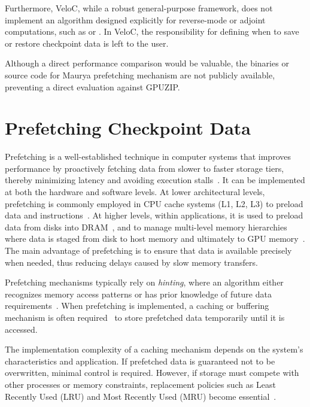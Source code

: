 \documentclass[Ingles]{ic-tese-v3}
\begin{document}
Furthermore, VeloC, while a robust general-purpose \checkpointing framework, does not implement an algorithm designed explicitly for reverse-mode or adjoint computations, such as \revolve or \zcut. In VeloC, the responsibility for defining when to save or restore checkpoint data is left to the user.

Although a direct performance comparison would be valuable, the binaries or source code for Maurya \etal prefetching mechanism are not publicly available, preventing a direct evaluation against GPUZIP.


\chapter{Prefetching Checkpoint Data}
\label{ch:prefetch}

Prefetching is a well-established technique in computer systems that improves performance by proactively fetching data from slower to faster storage tiers, thereby minimizing latency and avoiding execution stalls~\cite{mittal2017,vanderwiel2000}. It can be implemented at both the hardware and software levels. At lower architectural levels, prefetching is commonly employed in CPU cache systems (L1, L2, L3) to preload data and instructions~\cite{mittal2017,emma2005,hennessy}. At higher levels, within applications, it is used to preload data from disks into DRAM~\cite{patterson1995,butt2007}, and to manage multi-level memory hierarchies where data is staged from disk to host memory and ultimately to GPU memory~\cite{maurya2023}. The main advantage of prefetching is to ensure that data is available precisely when needed, thus reducing delays caused by slow memory transfers.

Prefetching mechanisms typically rely on \textit{hinting}, where an algorithm either recognizes memory access patterns or has prior knowledge of future data requirements~\cite{patterson1995, maurya2023}. When prefetching is implemented, a caching or buffering mechanism is often required~\cite{patterson1995, butt2007, maurya2023} to store prefetched data temporarily until it is accessed.

The implementation complexity of a caching mechanism depends on the system's characteristics and application. If prefetched data is guaranteed not to be overwritten, minimal control is required. However, if storage must compete with other processes or memory constraints, replacement policies such as Least Recently Used (LRU) and Most Recently Used (MRU) become essential~\cite{butt2007, carr1981}.
\end{document}
